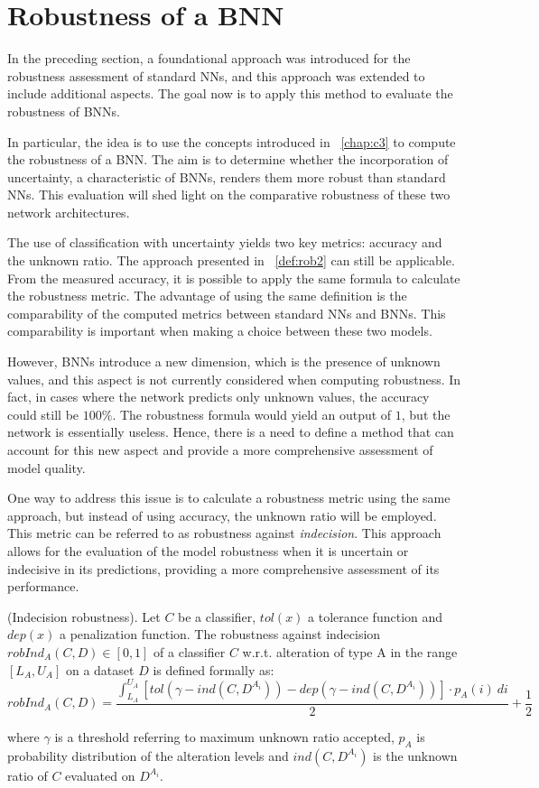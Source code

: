 \section{Robustness of a BNN}

In the preceding section, a foundational approach was introduced for the robustness assessment of standard NNs, and this approach was extended to include additional aspects. The goal now is to apply this method to evaluate the robustness of BNNs.

In particular, the idea is to use the concepts introduced in \Chap~\ref{chap:c3} to compute the robustness of a BNN. The aim is to determine whether the incorporation of uncertainty, a characteristic of BNNs, renders them more robust than standard NNs. This evaluation will shed light on the comparative robustness of these two network architectures.

The use of classification with uncertainty yields two key metrics: accuracy and the unknown ratio. The approach presented in \Def~\ref{def:rob2} can still be applicable. From the measured accuracy, it is possible to apply the same formula to calculate the robustness metric. The advantage of using the same definition is the comparability of the computed metrics between standard NNs and BNNs. This comparability is important when making a choice between these two models.

However, BNNs introduce a new dimension, which is the presence of unknown values, and this aspect is not currently considered when computing robustness. In fact, in cases where the network predicts only unknown values, the accuracy could still be $100\%$. The robustness formula would yield an output of $1$, but the network is essentially useless. Hence, there is a need to define a method that can account for this new aspect and provide a more comprehensive assessment of model quality.

One way to address this issue is to calculate a robustness metric using the same approach, but instead of using accuracy, the unknown ratio will be employed. This metric can be referred to as robustness against \textit{indecision}. This approach allows for the evaluation of the model robustness when it is uncertain or indecisive in its predictions, providing a more comprehensive assessment of its performance.

\begin{definition}\label{def:robind} (Indecision robustness).
	Let $C$ be a classifier, $tol(x)$ a tolerance function and $dep(x)$ a penalization function.
	The robustness against indecision $robInd_A(C,D) \in [0,1]$ of a classifier $C$ w.r.t. alteration of type A in the range $[L_A, U_A]$ on a dataset $D$ is defined formally as:
	\[
		robInd_A(C,D) = \frac{\int_{L_A}^{U_A} [tol(\gamma - ind(C,D^{A_i})) - dep(\gamma - ind(C,D^{A_i}))] \cdot p_A(i)\ di}{2} + \frac{1}{2}
	\]
	
	where $\gamma$ is a threshold referring to maximum unknown ratio accepted, $p_A$ is probability distribution of the alteration levels and $ind(C,D^{A_i})$ is the unknown ratio of $C$ evaluated on $D^{A_i}$.
\end{definition}

